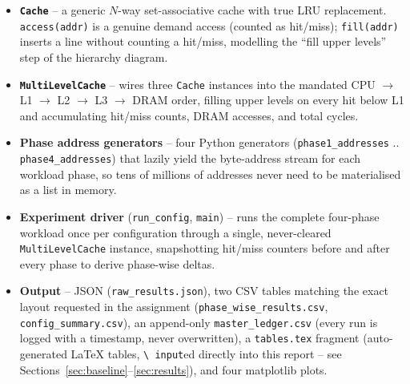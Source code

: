 \documentclass[11pt]{article}
\begin{document}
\begin{itemize}[leftmargin=1.6em]
  \item \textbf{\texttt{Cache}} -- a generic $N$-way set-associative cache
        with true LRU replacement. \texttt{access(addr)} is a genuine
        demand access (counted as hit/miss); \texttt{fill(addr)} inserts a
        line without counting a hit/miss, modelling the ``fill upper
        levels'' step of the hierarchy diagram.
  \item \textbf{\texttt{MultiLevelCache}} -- wires three \texttt{Cache}
        instances into the mandated CPU $\to$ L1 $\to$ L2 $\to$ L3
        $\to$ DRAM order, filling upper levels on every hit below L1 and
        accumulating hit/miss counts, DRAM accesses, and total cycles.
  \item \textbf{Phase address generators} -- four Python generators
        (\texttt{phase1\_addresses} .. \texttt{phase4\_addresses})
        that lazily yield the byte-address stream for each workload
        phase, so tens of millions of addresses never need to be
        materialised as a list in memory.
  \item \textbf{Experiment driver} (\texttt{run\_config},
        \texttt{main}) -- runs the complete four-phase workload once per
        configuration through a single, never-cleared
        \texttt{MultiLevelCache} instance, snapshotting hit/miss counters
        before and after every phase to derive phase-wise deltas.
  \item \textbf{Output} -- JSON (\texttt{raw\_results.json}), two CSV
        tables matching the exact layout requested in the assignment
        (\texttt{phase\_wise\_results.csv}, \texttt{config\_summary.csv}),
        an append-only \texttt{master\_ledger.csv} (every run is logged
        with a timestamp, never overwritten), a \texttt{tables.tex}
        fragment (auto-generated LaTeX tables, \texttt{\textbackslash
        input}ed directly into this report -- see
        Sections~\ref{sec:baseline}--\ref{sec:results}), and four
        matplotlib plots.
\end{itemize}
\end{document}
